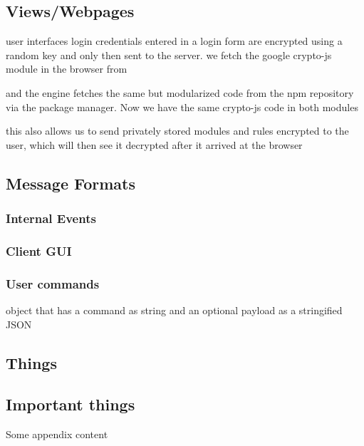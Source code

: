 \documentclass{article}
\begin{document}
\subsection{Views/Webpages}
user interfaces
login
credentials entered in a login form are encrypted using a random key and only then sent to the server.
we fetch the google crypto-js module in the browser from

and the engine fetches the same but modularized code from the npm repository via the package manager. Now we have the same crypto-js code in both modules

this also allows us to send privately stored modules and rules encrypted to the user, which will then see it decrypted after it arrived at the browser

\subsection{Message Formats}
\subsubsection{Internal Events}
\subsubsection{Client GUI}


\subsubsection{User commands}
object that has a command as string and an optional payload as a stringified JSON





\newpage
\renewcommand*\appendixpagename{APPENDIX}
\renewcommand*\appendixtocname{APPENDIX}
\begin{appendices}
 \section{Things}
   \subsection{Important things}
 Some appendix content
 
\end{appendices}
\end{document}

